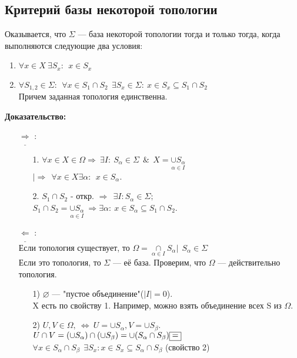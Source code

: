 \subsection{Критерий базы некоторой топологии}
Оказывается, что $\Sigma$ --- база некоторой топологии тогда и только тогда, когда выполняются следующие два условия:
\begin{enumerate}
\item $\forall x\in X ~\exists S_{x}:~~x\in S_{x}$
\item $\forall S_{1,2}\in \Sigma: ~~\forall x\in S_{1}\cap S_{2}~~ \exists S_{x}\in\Sigma:~x\in S_{x}\subseteq S_{1}\cap S_{2}$
\\ Причем заданная топология единственна.
\end{enumerate}
 \textbf{Доказательство:}
\begin{enumerate}
\item[$\underline{\Rightarrow}$]:
\begin{enumerate}
\item[1.] $\forall x\in X\in \Omega\Longrightarrow~\exists I:~ S_{\alpha}\in \Sigma ~~\&~~ X = \underset{\alpha\in I}{\cup S_{\alpha}} $
\\$|\Rightarrow~~ \forall x\in X \exists \alpha:~~x\in S_{\alpha}$.
\item[2.] $S_{1}\cap S_{2}$  - откр. $\Longrightarrow~~\exists I: S_{\alpha}\in\Sigma;$\\
$S_{1}\cap S_{2}=\underset{\alpha\in I}{\cup S_{\alpha}}~\Longrightarrow \exists\alpha:~x\in S_{\alpha}\subseteq S_{1}\cap S_{2}$. 
\end{enumerate}
\item[$\underline{\Leftarrow}$]:
\\ Если топология существует, то $\Omega = {\underset{\alpha\in I}{\cap}S_{\alpha}|~~S_{\alpha}\in\Sigma}$
\\ Если это топология, то $\Sigma$ --- её база. Проверим, что $\Omega$ --- действительно топология.
\begin{enumerate}
\item[1)] $\varnothing$ --- "пустое объединение"($|I|=0$).
\\X есть по свойству 1. Например, можно взять объединение всех S из $\Omega$.
\item[2)]$U, V\in\Omega,~\Longleftrightarrow ~ U=\cup S_{\alpha}, V = \cup S_{\beta}$.
\\ $U\cap V =(\cup S_{\alpha})\cap(\cup S_{\beta}) = \cup(S_{\alpha}\cap S_{\beta})\fbox{=} $
\\ $\forall x\in S_{\alpha}\cap S_{\beta}~~\exists S_{x}: x\in S_{x}\subseteq S_{\alpha}\cap S_{\beta}$      (свойство 2)

\end{enumerate}
\end{enumerate}
